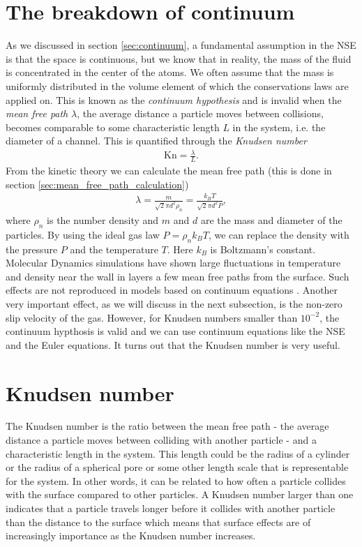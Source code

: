 \section{The breakdown of continuum}
\label{sec:continuum_breakdown}
As we discussed in section \ref{sec:continuum}, a fundamental assumption in the NSE is that the space is continuous, but we know that in reality, the mass of the fluid is concentrated in the center of the atoms. We often assume that the mass is uniformly distributed in the volume element of which the conservations laws are applied on. This is known as the \textit{continuum hypothesis} and is invalid when the \textit{mean free path} $\lambda$, the average distance a particle moves between collisions, becomes comparable to some characteristic length $L$ in the system, i.e. the diameter of a channel\cite{karniadakis2005microflows}. This is quantified through the \textit{Knudsen number}
\begin{align}
	\text{Kn} = \frac{\lambda}{L}.
\end{align}
From the kinetic theory we can calculate the mean free path (this is done in section \ref{sec:mean_free_path_calculation})
\begin{align}
	\lambda = \frac{m}{\sqrt 2 \pi d^2 \rho_n} = \frac{k_B T}{\sqrt 2 \pi d^2 P},
\end{align}
where $\rho_n$ is the number density and $m$ and $d$ are the mass and diameter of the particles. By using the ideal gas law $P = \rho_n k_BT$, we can replace the density with the pressure $P$ and the temperature $T$. Here $k_B$ is Boltzmann's constant. Molecular Dynamics simulations have shown large fluctuations in temperature and density near the wall in layers a few mean free paths from the surface. Such effects are not reproduced in models based on continuum equations \cite{karniadakis2005microflows}. Another very important effect, as we will discuss in the next subsection, is the non-zero slip velocity of the gas. However, for Knudsen numbers smaller than $10^{-2}$, the continuum hypthosis is valid and we can use continuum equations like the NSE and the Euler equations. It turns out that the Knudsen number is very useful.

\section{Knudsen number}
\label{sec:knudsen_number}
The Knudsen number is the ratio between the mean free path - the average distance a particle moves between colliding with another particle - and a characteristic length in the system. This length could be the radius of a cylinder or the radius of a spherical pore or some other length scale that is representable for the system. In other words, it can be related to how often a particle collides with the surface compared to other particles. A Knudsen number larger than one indicates that a particle travels longer before it collides with another particle than the distance to the surface which means that surface effects are of increasingly importance as the Knudsen number increases.


